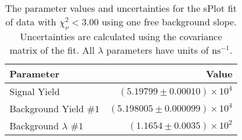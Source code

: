 
\begin{table}[ht]
    \begin{center}
        \begin{tabular}{lr}\toprule
            Parameter & Value \\\midrule
            Signal Yield & $(5.19799 \pm 0.00010) \times 10^{4}$ \\
            Background Yield $\#1$ & $(5.198005 \pm 0.000099) \times 10^{4}$ \\
            Background $\lambda$ $\#1$ & $(1.1654 \pm 0.0035) \times 10^{2}$ \\\bottomrule
        \end{tabular}
        \caption{The parameter values and uncertainties for the sPlot fit of data with $\chi^2_\nu < 3.00$ using one free background slope. Uncertainties are calculated using the covariance matrix of the fit. All $\lambda$ parameters have units of $\si{\nano\second}^{-1}$.}\label{tab:splot-fit-results-chisqdof-3.00-free-1}
    \end{center}
\end{table}
